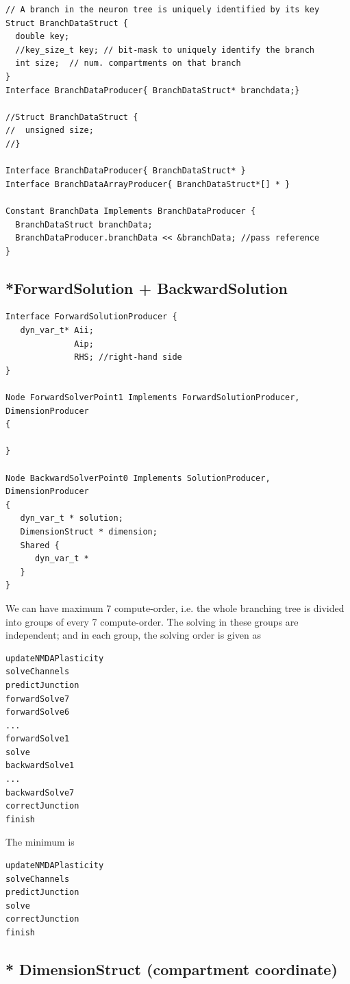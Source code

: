\begin{verbatim}
// A branch in the neuron tree is uniquely identified by its key
Struct BranchDataStruct {
  double key; 
  //key_size_t key; // bit-mask to uniquely identify the branch 
  int size;  // num. compartments on that branch
}
Interface BranchDataProducer{ BranchDataStruct* branchdata;}

//Struct BranchDataStruct {
//  unsigned size;
//}

Interface BranchDataProducer{ BranchDataStruct* }
Interface BranchDataArrayProducer{ BranchDataStruct*[] * }

Constant BranchData Implements BranchDataProducer {
  BranchDataStruct branchData;
  BranchDataProducer.branchData << &branchData; //pass reference
}
\end{verbatim}

\subsection{*ForwardSolution + BackwardSolution}

\begin{verbatim}
Interface ForwardSolutionProducer {
   dyn_var_t* Aii;
              Aip;
              RHS; //right-hand side
}

Node ForwardSolverPoint1 Implements ForwardSolutionProducer, DimensionProducer
{

}

Node BackwardSolverPoint0 Implements SolutionProducer, DimensionProducer
{
   dyn_var_t * solution;
   DimensionStruct * dimension;
   Shared {
      dyn_var_t * 
   }
}
\end{verbatim}

We can have maximum 7 compute-order, i.e. the whole branching tree is divided
into groups of every 7 compute-order. The solving in these groups are
independent; and in each group, the solving order is given as
\begin{verbatim}
updateNMDAPlasticity
solveChannels
predictJunction
forwardSolve7 
forwardSolve6 
...
forwardSolve1
solve
backwardSolve1
...
backwardSolve7
correctJunction
finish
\end{verbatim}
The minimum is 
\begin{verbatim}
updateNMDAPlasticity
solveChannels
predictJunction
solve
correctJunction
finish
\end{verbatim}


\subsection{* DimensionStruct (compartment coordinate)}
\label{sec:DimensionStruct}

